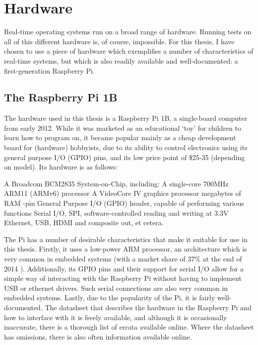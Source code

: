 \documentclass[twoside]{uva-inf-bachelor-thesis}
\begin{document}
%
%
%
%

\chapter{Hardware} \label{chp:hardware}
Real-time operating systems run on a broad range of hardware. Running tests on all of this different hardware is, of course, impossible. For this thesis, I have chosen to use a piece of hardware which exemplifies a number of characteristics of real-time systems, but which is also readily available and well-documented: a first-generation Raspberry Pi.

\section{The Raspberry Pi 1B}
The hardware used in this thesis is a Raspberry Pi 1B, a single-board computer from early 2012. While it was marketed as an educational `toy' for children to learn how to program on, it became popular mainly as a cheap development board for (hardware) hobbyists, due to its ability to control electronics using its general purpose I/O (GPIO) pins, and its low price point of \$25-35 (depending on model). Its hardware is as follows:

\begin{outline}
    \1 A Broadcom BCM2835 System-on-Chip, including:
        \2 A single-core 700MHz ARM11 (ARMv6) processor
        \2 A VideoCore IV graphics processor
         megabytes of RAM
    -pin General Purpose I/O (GPIO) header, capable of performing various functions
        \2 Serial I/O, SPI, software-controlled reading and writing at 3.3V
    \1 Ethernet, USB, HDMI and composite out, et cetera.
\end{outline}

The Pi has a number of desirable characteristics that make it suitable for use in this thesis. Firstly, it uses a low-power ARM processor, an architecture which is very common in embedded systems (with a market share of 37\% at the end of 2014 \cite{arm:embeddedmarketshare}). Additionally, its GPIO pins and their support for serial I/O allow for a simple way of interacting with the Raspberry Pi without having to implement USB or ethernet drivers. Such serial connections are also very common in embedded systems. Lastly, due to the popularity of the Pi, it is fairly well-documented. The datasheet that describes the hardware in the Raspberry Pi and how to interface with it is freely available\cite{bcm:2835peripherals}, and although it is occasionally inaccurate, there is a thorough list of errata available online\cite{bcm:2835errata}. Where the datasheet has omissions, there is also often information available online.
\end{document}
